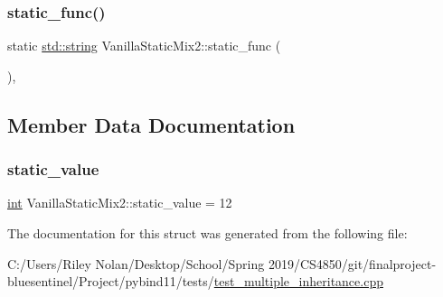 \subsubsection{\texorpdfstring{static\_func()}{static\_func()}}
{\footnotesize\ttfamily static \mbox{\hyperlink{_s_d_l__opengl__glext_8h_ab4ccfaa8ab0e1afaae94dc96ef52dde1}{std\+::string}} Vanilla\+Static\+Mix2\+::static\+\_\+func (\begin{DoxyParamCaption}{ }\end{DoxyParamCaption})\hspace{0.3cm}{\ttfamily [inline]}, {\ttfamily [static]}}



\subsection{Member Data Documentation}
\mbox{\label{struct_vanilla_static_mix2_aaf857eef76c09ce635283774c2f6b77b}} 
\subsubsection{\texorpdfstring{static\_value}{static\_value}}
{\footnotesize\ttfamily \mbox{\hyperlink{warnings_8h_a74f207b5aa4ba51c3a2ad59b219a423b}{int}} Vanilla\+Static\+Mix2\+::static\+\_\+value = 12\hspace{0.3cm}{\ttfamily [static]}}



The documentation for this struct was generated from the following file\+:\begin{DoxyCompactItemize}
\item 
C\+:/\+Users/\+Riley Nolan/\+Desktop/\+School/\+Spring 2019/\+C\+S4850/git/finalproject-\/bluesentinel/\+Project/pybind11/tests/\mbox{\hyperlink{test__multiple__inheritance_8cpp}{test\+\_\+multiple\+\_\+inheritance.\+cpp}}\end{DoxyCompactItemize}
